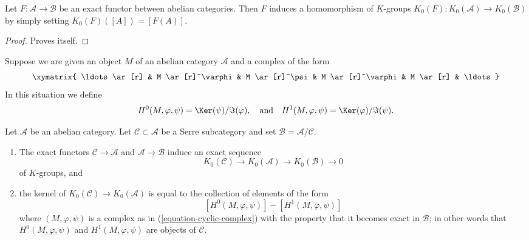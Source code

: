\begin{lemma}
\label{lemma-exact-functor-K-groups}
Let $F : \mathcal{A} \to \mathcal{B}$ be an exact functor between
abelian categories. Then $F$ induces a homomorphism of $K$-groups
$K_0(F) : K_0(\mathcal{A}) \to K_0(\mathcal{B})$ by simply setting
$K_0(F)([A]) = [F(A)]$.
\end{lemma}

\begin{proof}
Proves itself.
\end{proof}

\noindent
Suppose we are given an object $M$ of an abelian category $\mathcal{A}$
and a complex of the form
\begin{equation}
\label{equation-cyclic-complex}
\xymatrix{
\ldots \ar[r] &
M \ar[r]^\varphi &
M \ar[r]^\psi &
M \ar[r]^\varphi &
M \ar[r] & \ldots
}
\end{equation}
In this situation we define
$$
H^0(M, \varphi, \psi) = \Ker(\psi)/\Im(\varphi)
, \quad\text{and}\quad
H^1(M, \varphi, \psi) = \Ker(\varphi)/\Im(\psi).
$$

\begin{lemma}
\label{lemma-serre-subcategory-K-groups}
Let $\mathcal{A}$ be an abelian category.
Let $\mathcal{C} \subset \mathcal{A}$ be a Serre subcategory and
set $\mathcal{B} = \mathcal{A}/\mathcal{C}$.
\begin{enumerate}
\item The exact functors $\mathcal{C} \to \mathcal{A}$ and
$\mathcal{A} \to \mathcal{B}$ induce an exact sequence
$$
K_0(\mathcal{C}) \to
K_0(\mathcal{A}) \to
K_0(\mathcal{B}) \to
0
$$
of $K$-groups, and
\item the kernel of $K_0(\mathcal{C}) \to K_0(\mathcal{A})$ is equal
to the collection of elements of the form
$$
[H^0(M, \varphi, \psi)] - [H^1(M, \varphi, \psi)]
$$
where $(M, \varphi, \psi)$ is a complex as in (\ref{equation-cyclic-complex})
with the property that it becomes exact in $\mathcal{B}$; in other words
that $H^0(M, \varphi, \psi)$ and $H^1(M, \varphi, \psi)$ are
objects of $\mathcal{C}$.
\end{enumerate}
\end{lemma}

